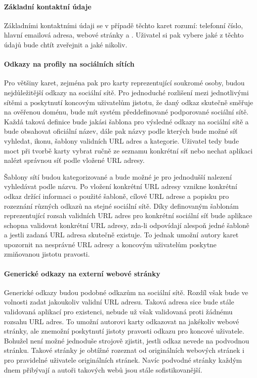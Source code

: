 	\paragraph{Základní kontaktní údaje}

	Základními kontaktními údaji se v případě těchto karet rozumí: telefonní číslo, hlavní emailová adresa, webové
	stránky a .
	Uživatel si pak vybere jaké z těchto údajů bude chtít zveřejnit a jaké nikoliv.

	\paragraph{Odkazy na profily na sociálních sítích}

	Pro většiny karet, zejména pak pro karty reprezentující soukromé osoby, budou nejdůležitější odkazy na sociální sítě.
	Pro jednoduché rozlišení mezi jednotlivými sítěmi a poskytnutí koncovým uživatelům jistotu, že daný odkaz skutečně
	směřuje na ověřenou doménu, bude mít systém předdefinované podporované sociální sítě.
	Každá taková definice bude jakási šablona pro výsledné odkazy na sociální sítě a bude obsahovat oficiální název,
	dále pak názvy podle kterých bude možné síť vyhledat, ikonu, šablony validních \ac{URL} adres a kategorie.
	Uživatel tedy bude moct při tvorbě karty vybrat ručně ze seznamu konkrétní síť nebo nechat aplikaci nalézt správnou
	síť podle vložené \ac{URL} adresy.

	Šablony sítí budou kategorizované a bude možné je pro jednodušší nalezení vyhledávat podle názvu.
	Po vložení konkrétní \ac{URL} adresy vznikne konkrétní odkaz držící informaci o použité šabloně, cílové \ac{URL} adrese a
	popisku pro rozeznání různých odkazů na stejné sociální sítě.
	Díky definovaným šablonám reprezentující rozsah validních \ac{URL} adres pro konkrétní sociální síť bude aplikace schopna
	validovat konkrétní \ac{URL} adresy, zda-li odpovídají alespoň jedné šabloně a jestli zadaná \ac{URL} adresa skutečně existuje.
	To jednak umožní autory karet upozornit na nesprávné \ac{URL} adresy a koncovým uživatelům poskytne zmiňovanou jistotu
	pravosti.

	\paragraph{Generické odkazy na externí webové stránky}

	Generické odkazy budou podobné odkazům na sociální sítě.
	Rozdíl však bude ve volnosti zadat jakoukoliv validní \ac{URL} adresu.
	Taková adresa sice bude stále validovaná aplikací pro existenci, nebude už však validovaná proti žádnému rozsahu
	\ac{URL} adres.
	To umožní autorovi karty odkazovat na jakékoliv webové stránky, ale znemožní poskytnutí jistoty pravosti odkazu
	pro koncové uživatele.
	Bohužel není možné jednoduše strojově zjistit, jestli odkaz nevede na podvodnou stránku.
	Takové stránky je obtížné rozeznat od originálních webových stránek i pro pravidelné uživatele originálních stránek.
	Navíc podvodné stránky každým dnem přibývají a autoři takových webů jsou stále sofistikovanější.

